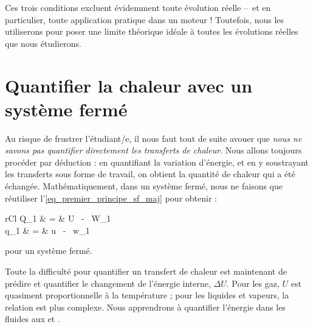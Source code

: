 		Ces trois conditions excluent évidemment toute évolution réelle --\ et en particulier, toute application pratique dans un moteur ! Toutefois, nous les utiliserons pour poser une limite théorique idéale à toutes les évolutions réelles que nous étudierons.



\section{Quantifier la chaleur avec un système fermé}

		Au risque de frustrer l’étudiant/e, il nous faut tout de suite avouer que \emph{nous ne savons pas quantifier directement les transferts de chaleur}. Nous allons toujours procéder par déduction : en quantifiant la variation d’énergie, et en y soustrayant les transferts sous forme de travail, on obtient la quantité de chaleur qui a été échangée. Mathématiquement, dans un système fermé, nous ne faisons que réutiliser l’\cref{eq_premier_principe_sf_maj} pour obtenir :
	\begin{IEEEeqnarray}{rCl}
		Q_{1 } 	& = & 	\Delta U \ - \  W_{1 } \\
		q_{1 } 	& = & 	\Delta u \ - \  w_{1 }
	\end{IEEEeqnarray}
	
	\begin{equationterms}
		\item pour un système fermé.
	\end{equationterms}
		
		Toute la difficulté pour quantifier un transfert de chaleur est maintenant de prédire et quantifier le changement de l’énergie interne, $\Delta U$. Pour les gaz, $U$ est quasiment proportionnelle à la température ; pour les liquides et vapeurs, la relation est plus complexe. Nous apprendrons à quantifier l’énergie dans les fluides aux \coursquatre et \courscinq.
